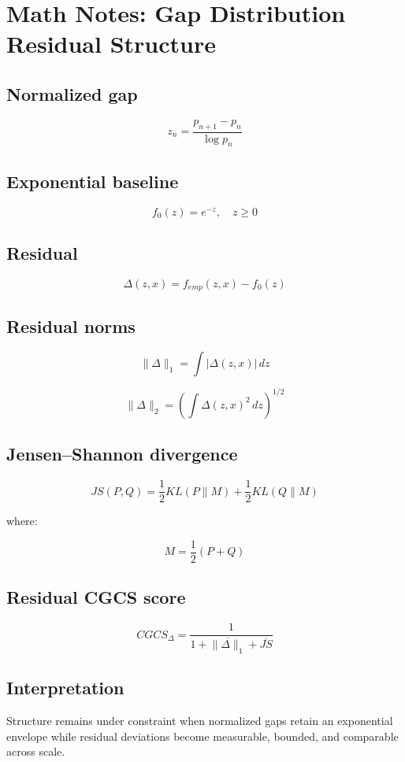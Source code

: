 \documentclass{article}
\begin{document}
\section*{Math Notes: Gap Distribution Residual Structure}

\subsection*{Normalized gap}

\[
z_n = \frac{p_{n+1}-p_n}{\log p_n}
\]

\subsection*{Exponential baseline}

\[
f_0(z)=e^{-z}, \quad z\ge 0
\]

\subsection*{Residual}

\[
\Delta(z,x)=f_{emp}(z,x)-f_0(z)
\]

\subsection*{Residual norms}

\[
\|\Delta\|_1 = \int |\Delta(z,x)|\,dz
\]

\[
\|\Delta\|_2 = \left(\int \Delta(z,x)^2\,dz\right)^{1/2}
\]

\subsection*{Jensen--Shannon divergence}

\[
JS(P,Q)=\frac12 KL(P\|M)+\frac12 KL(Q\|M)
\]

where:

\[
M=\frac12(P+Q)
\]

\subsection*{Residual CGCS score}

\[
CGCS_\Delta =
\frac{1}{1+\overline{\|\Delta\|_1}+\overline{JS}}
\]

\subsection*{Interpretation}

Structure remains under constraint when normalized gaps retain an exponential envelope while residual deviations become measurable, bounded, and comparable across scale.
\end{document}
